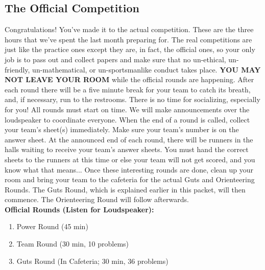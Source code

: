 \documentclass[11pt]{article}
\begin{document}
\begin{small}
\section{The Official Competition}
\noindent Congratulations! You've made it to the actual competition. These are the three hours that we've
spent the last month preparing for. The real competitions are just like the practice ones except they are, in fact, the official ones, so your only job is to pass out and collect papers and make sure that no un-ethical, un-friendly, un-mathematical, or un-sportsmanlike conduct takes place. \textbf{YOU MAY NOT LEAVE YOUR ROOM} while the official rounds are happening. After each round there will be a five minute break for your team to catch its breath, and, if necessary, run to the restrooms. There is no time for socializing, especially for you!  All rounds must start on time. We will make announcements over the loudspeaker to coordinate everyone. When the end of a round is called, collect your team's sheet(s) immediately. Make sure your team's number is on the answer sheet. At the announced end of each round, there will be runners in the halls waiting to receive your team's answer sheets. You must hand the correct sheets to the runners at this time or else your team will not get scored, and you know what that means... Once these interesting rounds are done, clean up your room and bring your team to the cafeteria for the actual Guts and Orienteering Rounds. The Guts Round, which is explained earlier in this packet, will then commence. The Orienteering Round will follow afterwards. \\

\noindent \textbf{Official Rounds (Listen for Loudspeaker): }
\begin{enumerate}
  \item Power Round (45 min)
  \item Team Round (30 min, 10 problems)
  \item Guts Round (In Cafeteria; 30 min, 36 problems)
\end{enumerate}


\end{small}
\end{document}
